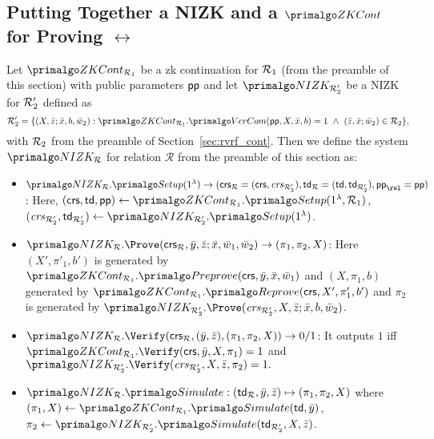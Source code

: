 
\subsection{Putting Together a NIZK and a $\ZKCont$  for Proving $\rel$} \label{sec:nizkR}

Let $\ZKCont_{\relone}$ be a zk continuation for $\mathcal{R}_1$ (from the preamble of this section)  with public parameters $ \mathsf{pp} $ and 
let $\nizktwo$ be a NIZK for $\mathcal{R}_2'$ defined as
$$\reltwo' = \{(X, \barz; \barx, b, \baromega_2): \ZKCont_{\relone}.\VerifyCom(\pp, X, \barx, b) =1\ 
\wedge \ (\barz, \barx; \baromega_2) \in \reltwo \},$$ 
with $\mathcal{R}_2$ from the preamble of Section~\ref{sec:rvrf_cont}. Then we define the system $\nizkR$ for relation $\mathcal{R}$ 
from the preamble of this section as:
\begin{itemize}
\item $\nizkR.\Setup(1^{\lambda})\rightarrow (\crsR = (\crs,\crstwo), \twR = (\tw, \twtwo), \pp_\rel = \pp)$: Here,
$(\crs, \tw, \allowbreak \pp) \leftarrow \ZKCont_{\relone}.\Setup(1^{\lambda}, \relone)$, $(\crstwo, \twtwo) \leftarrow \nizktwo.\Setup(1^{\lambda})$.


\item $\nizkR.\Prove(\crsR,\bary, \barz; \barx, \baromega_1, \baromega_2 ) \rightarrow (\pi_1, \pi_2, X)$: Here 
$(X', \pi'_1, b')$ is generated by $\ZKCont_{\relone}.\Preprove(\crs, \allowbreak \bar{y}, \allowbreak \bar{x}, \baromega_1)$ and 
$(X, \pi_1, b)$ generated by  $\ZKCont_{\relone}.\Reprove(\crs, X', \allowbreak \pi_1', b')$ and $ \pi_2 $ is generated by
$ \nizktwo.\Prove(\crstwo, \allowbreak X, \allowbreak \barz; \allowbreak \barx, b, \baromega_2)$. 

\item $\nizkR.\Verify(\crsR,(\bary, \barz), (\pi_1, \pi_2, X)) \rightarrow 0/1$: It outputs $1$ iff 
$\ZKCont_{\relone}.\Verify(\crs, \allowbreak \bar{y}, \allowbreak X, \pi_1) = 1 $ and $ \nizktwo.\Verify(\crstwo, X, \barz, \pi_2) =1.$

\item $\nizkR.\Sim: (\twR, \bary, \barz) \mapsto (\pi_1, \pi_2, X)$ where 
$(\pi_1, X) \leftarrow \ZKCont_{\relone}.\Sim(\tw, \bary)$, $\pi_2 \leftarrow \nizktwo.\Sim(\twtwo, X, \barz)$.
 \end{itemize}


